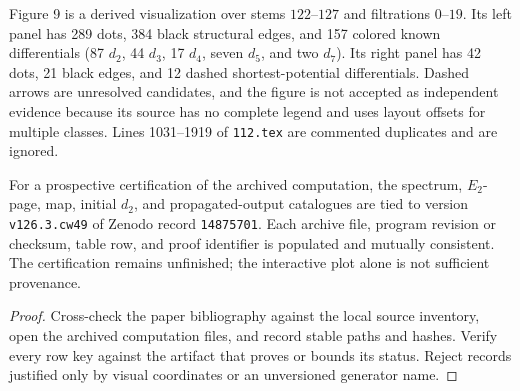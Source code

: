 \begin{definition}
  \label{def:near126-figure-contract}
  \notready
  Figure 9 is a derived visualization over stems $122$--$127$ and filtrations
  $0$--$19$.  Its left panel has 289 dots, 384 black structural edges, and 157
  colored known differentials (87 $d_2$, 44 $d_3$, 17 $d_4$, seven $d_5$,
  and two $d_7$).  Its right panel has 42 dots, 21 black edges, and 12 dashed
  shortest-potential differentials.  Dashed arrows are unresolved candidates,
  and the figure is not accepted as independent evidence because its source
  has no complete legend and uses layout offsets for multiple classes.  Lines
  1031--1919 of \texttt{112.tex} are commented duplicates and are ignored.
\end{definition}

\begin{proposition}
  \label{prop:lin-computation-provenance}
  \notready
  For a prospective certification of the archived computation, the spectrum, $E_2$-page, map, initial
  $d_2$, and propagated-output catalogues are tied to version
  \texttt{v126.3.cw49} of Zenodo record \texttt{14875701}.  Each archive file,
  program revision or checksum, table row, and proof identifier is populated
  and mutually consistent.  The certification remains unfinished; the interactive plot alone is not sufficient provenance.
\end{proposition}

\begin{proof}
  Cross-check the paper bibliography against the local source inventory, open
  the archived computation files, and record stable paths and hashes.  Verify
  every row key against the artifact that proves or bounds its status.  Reject
  records justified only by visual coordinates or an unversioned generator
  name.
\end{proof}

